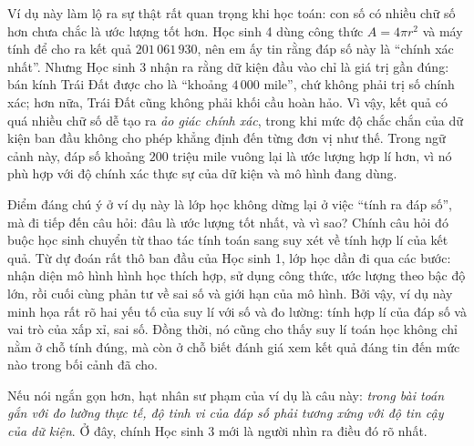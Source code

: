   {
    Ví dụ này làm lộ ra sự thật rất quan trọng khi học toán: con số có nhiều chữ số hơn chưa chắc là ước lượng tốt hơn. Học sinh 4 dùng công thức $A = 4\pi r^2$ và máy tính để cho ra kết quả $201\,061\,930$, nên em ấy tin rằng đáp số này là ``chính xác nhất''. Nhưng Học sinh 3 nhận ra rằng dữ kiện đầu vào chỉ là giá trị gần đúng: bán kính Trái Đất được cho là ``khoảng $4\,000$ mile'', chứ không phải trị số chính xác; hơn nữa, Trái Đất cũng không phải khối cầu hoàn hảo. Vì vậy, kết quả có quá nhiều chữ số dễ tạo ra \emph{ảo giác chính xác}, trong khi mức độ chắc chắn của dữ kiện ban đầu không cho phép khẳng định đến từng đơn vị như thế. Trong ngữ cảnh này, đáp số khoảng $200$ triệu mile vuông lại là ước lượng hợp lí hơn, vì nó phù hợp với độ chính xác thực sự của dữ kiện và mô hình đang dùng.

    Điểm đáng chú ý ở ví dụ này là lớp học không dừng lại ở việc ``tính ra đáp số'', mà đi tiếp đến câu hỏi: đâu là ước lượng tốt nhất, và vì sao? Chính câu hỏi đó buộc học sinh chuyển từ thao tác tính toán sang suy xét về tính hợp lí của kết quả. Từ dự đoán rất thô ban đầu của Học sinh 1, lớp học dần đi qua các bước: nhận diện mô hình hình học thích hợp, sử dụng công thức, ước lượng theo bậc độ lớn, rồi cuối cùng phản tư về sai số và giới hạn của mô hình. Bởi vậy, ví dụ này minh họa rất rõ hai yếu tố của suy lí với số và đo lường: tính hợp lí của đáp số và vai trò của xấp xỉ, sai số. Đồng thời, nó cũng cho thấy suy lí toán học không chỉ nằm ở chỗ tính đúng, mà còn ở chỗ biết đánh giá xem kết quả đáng tin đến mức nào trong bối cảnh đã cho.

    Nếu nói ngắn gọn hơn, hạt nhân sư phạm của ví dụ là câu này: \emph{trong bài toán gắn với đo lường thực tế, độ tinh vi của đáp số phải tương xứng với độ tin cậy của dữ kiện}. Ở đây, chính Học sinh 3 mới là người nhìn ra điều đó rõ nhất.
  }

